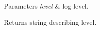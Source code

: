 \begin{DoxyParams}{Parameters}
{\em level} & log level.\\
\hline
\end{DoxyParams}
\begin{DoxyReturn}{Returns}
string describing level. 
\end{DoxyReturn}

